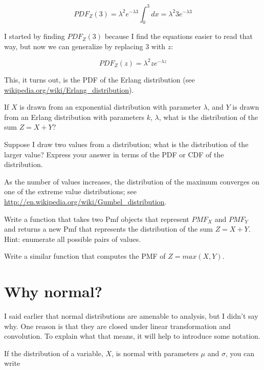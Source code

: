 \documentclass[12pt]{book}
\begin{document}
\[ PDF_Z(3) = \lambda^2 e^{-\lambda 3} \int_{0}^{3} dx = 
\lambda^2 3 e^{-\lambda 3} \]

I started by finding $PDF_Z(3)$ because I find the equations easier to
read that way, but now we can generalize by replacing 3 with $z$:

\[ PDF_Z(z) = \lambda^2 z e^{-\lambda z} \]

This, it turns out, is the PDF of the Erlang distribution (see
\url{wikipedia.org/wiki/Erlang_distribution}).


\begin{ex}
If $X$ is drawn from an exponential distribution with parameter
$\lambda$, and $Y$ is drawn from an Erlang distribution with parameters
$k$, $\lambda$, what is the distribution of the sum $Z = X+Y$?
\end{ex}

\begin{ex}
Suppose I draw two values from a distribution; what is the distribution
of the larger value?  Express your answer in terms of the PDF or CDF of
the distribution.

As the number of values increases, the distribution of the maximum
converges on one of the extreme value distributions; see
\url{http://en.wikipedia.org/wiki/Gumbel_distribution}.
\end{ex}

\begin{ex}
Write a function that takes two Pmf objects that represent $PMF_X$ and
$PMF_Y$ and returns a new Pmf that represents the distribution of
the sum $Z = X+Y$.  Hint: enumerate all possible pairs of values.

Write a similar function that computes the PMF of $Z = max(X,Y)$.
\end{ex}



\section{Why normal?}
\label{why_normal}

I said earlier that normal distributions are amenable to analysis,
but I didn't say why.  One reason is that they are
closed under linear transformation and convolution.  To explain what
that means, it will help to introduce some notation.

If the distribution of a variable, $X$, is
normal with parameters $\mu$ and $\sigma$, you can write

\newcommand{\normal}{\mathcal{N}}
\newcommand{\hasdist}{\sim}
\end{document}
